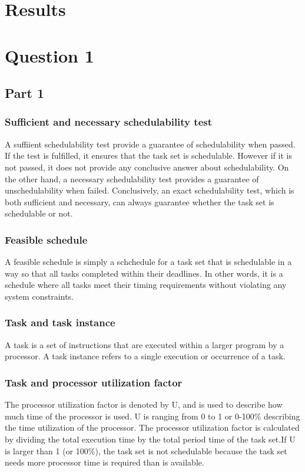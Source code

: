 \section{Results}
\label{section:results}

\section{Question 1} 
        \subsection{Part 1}
            \subsubsection{Sufficient and necessary schedulability test}
            A suffiient schedulability test provide a guarantee of schedulability when passed. If the test is fulfilled, it ensures that the task set is schedulable. However if it is not passed, it does not provide any conclusive answer about schedulability. On the other hand, a necessary schedulability test provides a guarantee of unschedulability when failed. Conclusively, an exact schedulability test, which is both sufficient and necessary, can always guarantee whether the task set is schedulable or not.

            \subsubsection{Feasible schedule}
            A feasible schedule is simply a schchedule for a task set that is schedulable in a way so that all tasks completed within their deadlines. In other words, it is a schedule where all tasks meet their timing requirements without violating any system constraints.

            \subsubsection{Task and task instance}
            A task is a set of instructions that are executed within a larger program by a processor. A task instance refers to a single execution or occurrence of a task.

            \subsubsection{Task and processor utilization factor}
            The processor utilization factor is denoted by U, and is used to describe how much time of the processor is used. U is ranging from 0 to 1 or 0-100\% describing the time utilization of the processor. The processor utilization factor is calculated by dividing the total execution time by the total period time of the task set.If U is larger than 1 (or 100\%), the task set is not schedulable because the task set needs more processor time is required than is available.
            

